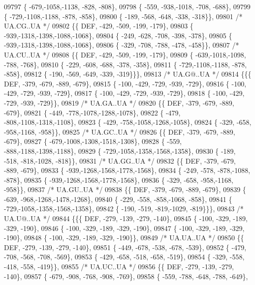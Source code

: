 \begin{DoxyCode}
09797 \{ -679,-1058,-1138, -828, -808\},
09798 \{ -559, -938,-1018, -708, -688\},
09799 \{ -729,-1108,-1188, -878, -858\},
09800 \{ -189, -568, -648, -338, -318\}\},
09801 \textcolor{comment}{/* UA.CG..UA */}
09802 \{\{  DEF, -429, -509, -199, -179\},
09803 \{ -939,-1318,-1398,-1088,-1068\},
09804 \{ -249, -628, -708, -398, -378\},
09805 \{ -939,-1318,-1398,-1088,-1068\},
09806 \{ -329, -708, -788, -478, -458\}\},
09807 \textcolor{comment}{/* UA.CU..UA */}
09808 \{\{  DEF, -429, -509, -199, -179\},
09809 \{ -639,-1018,-1098, -788, -768\},
09810 \{ -229, -608, -688, -378, -358\},
09811 \{ -729,-1108,-1188, -878, -858\},
09812 \{ -190, -569, -649, -339, -319\}\}\},
09813 \textcolor{comment}{/* UA.G@..UA */}
09814 \{\{\{  DEF, -379, -679, -889, -679\},
09815 \{ -100, -429, -729, -939, -729\},
09816 \{ -100, -429, -729, -939, -729\},
09817 \{ -100, -429, -729, -939, -729\},
09818 \{ -100, -429, -729, -939, -729\}\},
09819 \textcolor{comment}{/* UA.GA..UA */}
09820 \{\{  DEF, -379, -679, -889, -679\},
09821 \{ -449, -778,-1078,-1288,-1078\},
09822 \{ -479, -808,-1108,-1318,-1108\},
09823 \{ -429, -758,-1058,-1268,-1058\},
09824 \{ -329, -658, -958,-1168, -958\}\},
09825 \textcolor{comment}{/* UA.GC..UA */}
09826 \{\{  DEF, -379, -679, -889, -679\},
09827 \{ -679,-1008,-1308,-1518,-1308\},
09828 \{ -559, -888,-1188,-1398,-1188\},
09829 \{ -729,-1058,-1358,-1568,-1358\},
09830 \{ -189, -518, -818,-1028, -818\}\},
09831 \textcolor{comment}{/* UA.GG..UA */}
09832 \{\{  DEF, -379, -679, -889, -679\},
09833 \{ -939,-1268,-1568,-1778,-1568\},
09834 \{ -249, -578, -878,-1088, -878\},
09835 \{ -939,-1268,-1568,-1778,-1568\},
09836 \{ -329, -658, -958,-1168, -958\}\},
09837 \textcolor{comment}{/* UA.GU..UA */}
09838 \{\{  DEF, -379, -679, -889, -679\},
09839 \{ -639, -968,-1268,-1478,-1268\},
09840 \{ -229, -558, -858,-1068, -858\},
09841 \{ -729,-1058,-1358,-1568,-1358\},
09842 \{ -190, -519, -819,-1029, -819\}\}\},
09843 \textcolor{comment}{/* UA.U@..UA */}
09844 \{\{\{  DEF, -279, -139, -279, -140\},
09845 \{ -100, -329, -189, -329, -190\},
09846 \{ -100, -329, -189, -329, -190\},
09847 \{ -100, -329, -189, -329, -190\},
09848 \{ -100, -329, -189, -329, -190\}\},
09849 \textcolor{comment}{/* UA.UA..UA */}
09850 \{\{  DEF, -279, -139, -279, -140\},
09851 \{ -449, -678, -538, -678, -539\},
09852 \{ -479, -708, -568, -708, -569\},
09853 \{ -429, -658, -518, -658, -519\},
09854 \{ -329, -558, -418, -558, -419\}\},
09855 \textcolor{comment}{/* UA.UC..UA */}
09856 \{\{  DEF, -279, -139, -279, -140\},
09857 \{ -679, -908, -768, -908, -769\},
09858 \{ -559, -788, -648, -788, -649\},

\end{DoxyCode}
